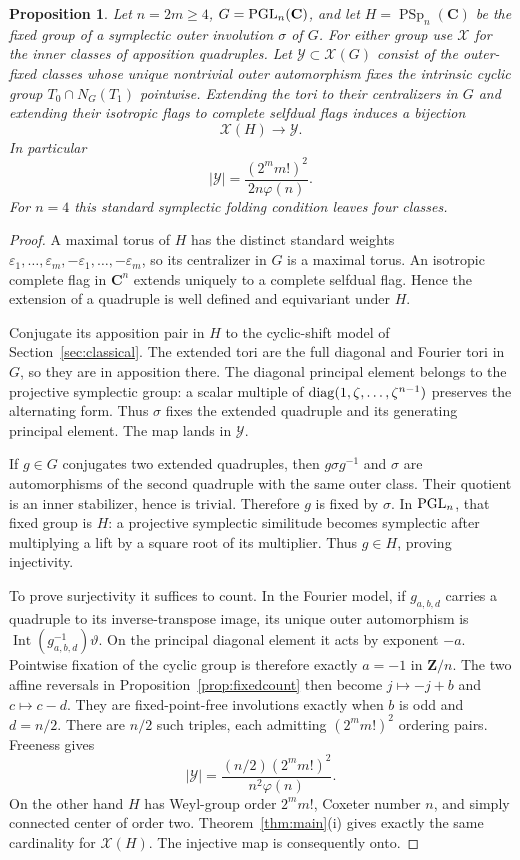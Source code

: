 \documentclass[11pt]{article}
\newcommand{\C}{\mathbf C}\newcommand{\Z}{\mathbf Z}\newcommand{\Q}{\mathbf Q}
\newtheorem{proposition}[theorem]{Proposition}
\theoremstyle{definition}\newtheorem{definition}[theorem]{Definition}
\theoremstyle{remark}\newtheorem{remark}[theorem]{Remark}
\begin{document}
\begin{proposition}\label{prop:folding}
Let $n=2m\geq4$, $G=\PGL_n(\C)$, and let $H=\operatorname{PSp}_n(\C)$ be the fixed group of a symplectic outer involution $\sigma$ of $G$. For either group use $\mathcal X$ for the inner classes of apposition quadruples. Let $\mathcal Y\subset\mathcal X(G)$ consist of the outer-fixed classes whose unique nontrivial outer automorphism fixes the intrinsic cyclic group $T_0\cap N_G(T_1)$ pointwise. Extending the tori to their centralizers in $G$ and extending their isotropic flags to complete selfdual flags induces a bijection
\[
 \mathcal X(H)\longrightarrow\mathcal Y.
\]
In particular
\[
 |\mathcal Y|=\frac{(2^m m!)^2}{2n\varphi(n)}.
\]
For $n=4$ this standard symplectic folding condition leaves four classes.
\end{proposition}
\begin{proof}
A maximal torus of $H$ has the distinct standard weights $\varepsilon_1,\ldots,\varepsilon_m,-\varepsilon_1,\ldots,-\varepsilon_m$, so its centralizer in $G$ is a maximal torus. An isotropic complete flag in $\C^n$ extends uniquely to a complete selfdual flag. Hence the extension of a quadruple is well defined and equivariant under $H$.

Conjugate its apposition pair in $H$ to the cyclic-shift model of Section~\ref{sec:classical}. The extended tori are the full diagonal and Fourier tori in $G$, so they are in apposition there. The diagonal principal element belongs to the projective symplectic group: a scalar multiple of $\operatorname{diag}(1,\zeta,\ldots,\zeta^{n-1})$ preserves the alternating form. Thus $\sigma$ fixes the extended quadruple and its generating principal element. The map lands in $\mathcal Y$.

If $g\in G$ conjugates two extended quadruples, then $g\sigma g^{-1}$ and $\sigma$ are automorphisms of the second quadruple with the same outer class. Their quotient is an inner stabilizer, hence is trivial. Therefore $g$ is fixed by $\sigma$. In $\operatorname{PGL}_n$, that fixed group is $H$: a projective symplectic similitude becomes symplectic after multiplying a lift by a square root of its multiplier. Thus $g\in H$, proving injectivity.

To prove surjectivity it suffices to count. In the Fourier model, if $g_{a,b,d}$ carries a quadruple to its inverse-transpose image, its unique outer automorphism is $\operatorname{Int}(g_{a,b,d}^{-1})\vartheta$. On the principal diagonal element it acts by exponent $-a$. Pointwise fixation of the cyclic group is therefore exactly $a=-1$ in $\Z/n$. The two affine reversals in Proposition~\ref{prop:fixedcount} then become $j\mapsto-j+b$ and $c\mapsto c-d$. They are fixed-point-free involutions exactly when $b$ is odd and $d=n/2$. There are $n/2$ such triples, each admitting $(2^m m!)^2$ ordering pairs. Freeness gives
\[
 |\mathcal Y|=\frac{(n/2)(2^m m!)^2}{n^2\varphi(n)}.
\]
On the other hand $H$ has Weyl-group order $2^m m!$, Coxeter number $n$, and simply connected center of order two. Theorem~\ref{thm:main}(i) gives exactly the same cardinality for $\mathcal X(H)$. The injective map is consequently onto.
\end{proof}
\end{document}
